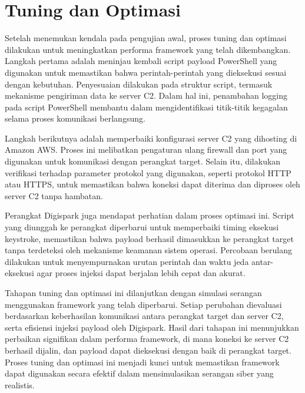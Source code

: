 \section{Tuning dan Optimasi}
Setelah menemukan kendala pada pengujian awal, proses tuning dan optimasi dilakukan untuk meningkatkan performa framework yang telah dikembangkan. Langkah pertama adalah meninjau kembali script payload PowerShell yang digunakan untuk memastikan bahwa perintah-perintah yang dieksekusi sesuai dengan kebutuhan. Penyesuaian dilakukan pada struktur script, termasuk mekanisme pengiriman data ke server C2. Dalam hal ini, penambahan logging pada script PowerShell membantu dalam mengidentifikasi titik-titik kegagalan selama proses komunikasi berlangsung.


Langkah berikutnya adalah memperbaiki konfigurasi server C2 yang dihosting di Amazon AWS. Proses ini melibatkan pengaturan ulang firewall dan port yang digunakan untuk komunikasi dengan perangkat target. Selain itu, dilakukan verifikasi terhadap parameter protokol yang digunakan, seperti protokol HTTP atau HTTPS, untuk memastikan bahwa koneksi dapat diterima dan diproses oleh server C2 tanpa hambatan.


Perangkat Digispark juga mendapat perhatian dalam proses optimasi ini. Script yang diunggah ke perangkat diperbarui untuk memperbaiki timing eksekusi keystroke, memastikan bahwa payload berhasil dimasukkan ke perangkat target tanpa terdeteksi oleh mekanisme keamanan sistem operasi. Percobaan berulang dilakukan untuk menyempurnakan urutan perintah dan waktu jeda antar-eksekusi agar proses injeksi dapat berjalan lebih cepat dan akurat.


Tahapan tuning dan optimasi ini dilanjutkan dengan simulasi serangan menggunakan framework yang telah diperbarui. Setiap perubahan dievaluasi berdasarkan keberhasilan komunikasi antara perangkat target dan server C2, serta efisiensi injeksi payload oleh Digispark. Hasil dari tahapan ini menunjukkan perbaikan signifikan dalam performa framework, di mana koneksi ke server C2 berhasil dijalin, dan payload dapat dieksekusi dengan baik di perangkat target. Proses tuning dan optimasi ini menjadi kunci untuk memastikan framework dapat digunakan secara efektif dalam mensimulasikan serangan siber yang realistis.
